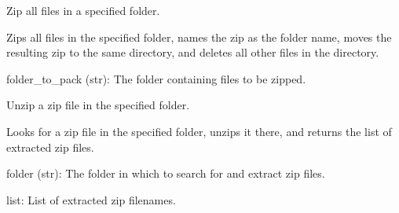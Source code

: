 \documentclass[letterpaper,10pt,english]{sphinxmanual}
\begin{document}

\begin{fulllineitems}
\label{\detokenize{autoapi/unduwave/helpers/file_folder_helpers/index:unduwave.helpers.file_folder_helpers.zip_files_in_folder}}
\pysigstartsignatures
{}
\pysigstopsignatures
\sphinxAtStartPar
Zip all files in a specified folder.

\sphinxAtStartPar
Zips all files in the specified folder, names the zip as the folder name,
moves the resulting zip to the same directory, and deletes all other files in the directory.
\begin{description}
\sphinxAtStartPar
folder\_to\_pack (str): The folder containing files to be zipped.

\end{description}

\end{fulllineitems}


\begin{fulllineitems}
\label{\detokenize{autoapi/unduwave/helpers/file_folder_helpers/index:unduwave.helpers.file_folder_helpers.unzip_zip_in_folder}}
\pysigstartsignatures
{}
\pysigstopsignatures
\sphinxAtStartPar
Unzip a zip file in the specified folder.

\sphinxAtStartPar
Looks for a zip file in the specified folder, unzips it there,
and returns the list of extracted zip files.
\begin{description}
\sphinxAtStartPar
folder (str): The folder in which to search for and extract zip files.

\sphinxAtStartPar
list: List of extracted zip filenames.

\end{description}

\end{fulllineitems}
\end{document}
